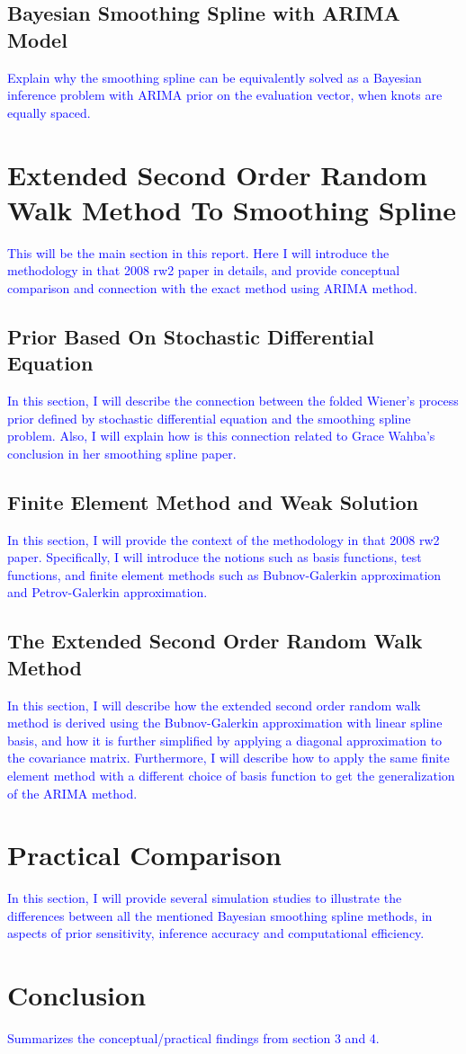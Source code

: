 \documentclass{article}
\newcommand{\ziang}{\textcolor{blue}}
\begin{document}
\subsection{Bayesian Smoothing Spline with ARIMA Model}
\ziang{Explain why the smoothing spline can be equivalently solved as a Bayesian inference problem with ARIMA prior on the evaluation vector, when knots are equally spaced.}
\section{Extended Second Order Random Walk Method To Smoothing Spline}\label{rw2}
\ziang{This will be the main section in this report. Here I will introduce the methodology in that 2008 rw2 paper in details, and provide conceptual comparison and connection with the exact method using ARIMA method.}
\subsection{Prior Based On Stochastic Differential Equation}
\ziang{In this section, I will describe the connection between the folded Wiener's process prior defined by stochastic differential equation and the smoothing spline problem. Also, I will explain how is this connection related to Grace Wahba's conclusion in her smoothing spline paper.}
\subsection{Finite Element Method and Weak Solution}
\ziang{In this section, I will provide the context of the methodology in that 2008 rw2 paper. Specifically, I will introduce the notions such as basis functions, test functions, and finite element methods such as Bubnov-Galerkin approximation and Petrov-Galerkin approximation.}
\subsection{The Extended Second Order Random Walk Method}
\ziang{In this section, I will describe how the extended second order random walk method is derived using the Bubnov-Galerkin approximation with linear spline basis, and how it is further simplified by applying a diagonal approximation to the covariance matrix. Furthermore, I will describe how to apply the same finite element method with a different choice of basis function to get the generalization of the ARIMA method.}
\section{Practical Comparison}\label{simulation}
\ziang{In this section, I will provide several simulation studies to illustrate the differences between all the mentioned Bayesian smoothing spline methods, in aspects of prior sensitivity, inference accuracy and computational efficiency.}
\section{Conclusion}\label{conclusion}
\ziang{Summarizes the conceptual/practical findings from section 3 and 4.}

\newpage


\end{document}
